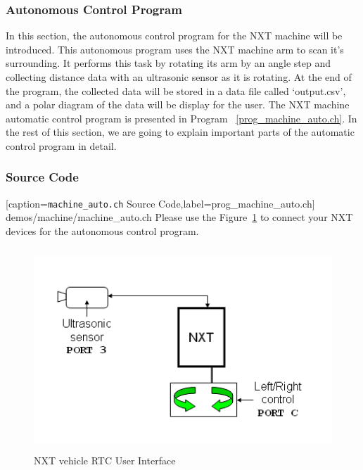 \documentclass[11pt]{article}
\begin{document}
\subsubsection{Autonomous Control Program}
In this section, the autonomous control program for the NXT machine will be introduced.
This autonomous program uses the NXT machine arm to scan it's surrounding. It performs 
this task by rotating its arm by an angle step and collecting distance data with an 
ultrasonic sensor as it is rotating. At the end of the program, the collected data will be 
stored in a data file called `output.csv', and a polar diagram of the data will be display 
for the user. The NXT machine automatic control program is presented in Program~
\ref{prog_machine_auto.ch}. In the rest of this section, we are going to explain important 
parts of the automatic control program in detail.

\subsubsection*{Source Code}

[caption={{\tt machine\_auto.ch} Source Code},label=prog_machine_auto.ch]
{demos/machine/machine_auto.ch}
Please use the Figure~\ref{fig_NXT_machauto_port} to connect your NXT devices for the 
autonomous control program.
\begin{figure}[h!]
    \begin{center}
    \includegraphics[height=3in]{figure/mindstorm/NXT_machauto_port.png}
    \caption{NXT vehicle RTC User Interface \label{fig_NXT_machauto_port}}
\end{center}
\end{figure}
\end{document}

